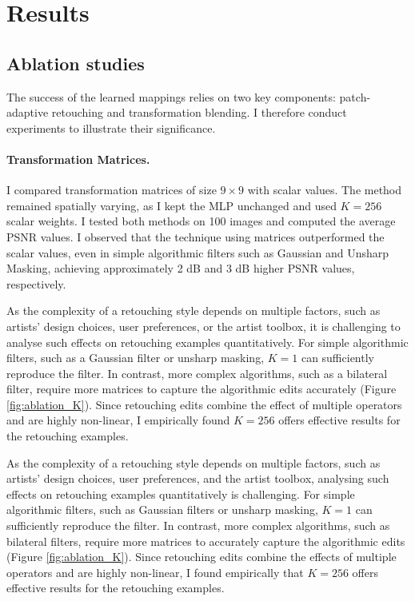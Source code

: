 \section{Results}
\label{sec:results}


\subsection{Ablation studies}\label{ablation}
The success of the learned mappings relies on two key components: patch-adaptive retouching and transformation blending. I therefore conduct experiments to illustrate their significance.

\paragraph{Transformation Matrices.} I compared transformation matrices of size $9 \times 9$ with scalar values. The method remained spatially varying, as I kept the MLP unchanged and used $K=256$ scalar weights. I tested both methods on 100 images and computed the average PSNR values. I observed that the technique using matrices outperformed the scalar values, even in simple algorithmic filters such as Gaussian and Unsharp Masking, achieving approximately 2 dB and 3 dB higher PSNR values, respectively.

As the complexity of a retouching style depends on multiple factors, such as artists’ design choices, user preferences, or the artist toolbox, it is challenging to analyse such effects on retouching examples quantitatively. For simple algorithmic filters, such as a Gaussian filter or unsharp masking, $K=1$ can sufficiently reproduce the filter. In contrast, more complex algorithms, such as a bilateral filter, require more matrices to capture the algorithmic edits accurately (Figure \ref{fig:ablation_K}). Since retouching edits combine the effect of multiple operators and are highly non-linear, I empirically found $K=256$ offers effective results for the retouching examples. 

As the complexity of a retouching style depends on multiple factors, such as artists’ design choices, user preferences, and the artist toolbox, analysing such effects on retouching examples quantitatively is challenging. For simple algorithmic filters, such as Gaussian filters or unsharp masking, $K=1$ can sufficiently reproduce the filter. In contrast, more complex algorithms, such as bilateral filters, require more matrices to accurately capture the algorithmic edits (Figure \ref{fig:ablation_K}). Since retouching edits combine the effects of multiple operators and are highly non-linear, I found empirically that $K=256$ offers effective results for the retouching examples.


